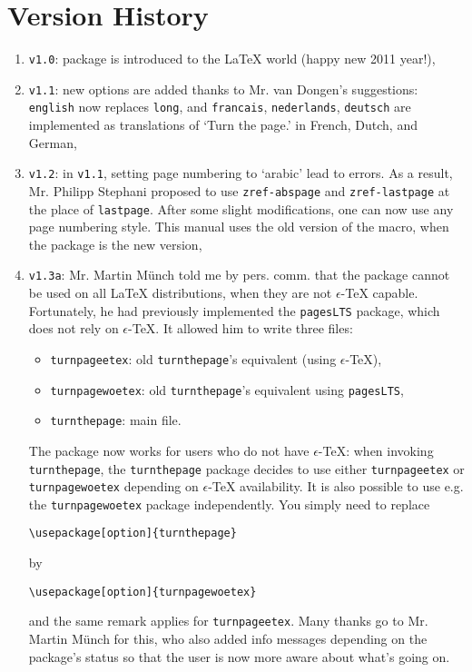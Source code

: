 \documentclass[10pt,a4paper,final,makeidx,twosides]{article}
\newcommand{\etex}{$\epsilon$-\TeX}
\begin{document}
\section{Version History}
\label{sec:vh}
\begin{enumerate}
\addtocounter{enumi}{-1}
 \item \verb|v1.0|: package is introduced to the \LaTeX{} world (happy new 2011 year!),
 \item \verb|v1.1|: new options are added thanks to Mr. van Dongen's suggestions: \verb|english| now replaces \verb|long|, and \verb|francais|, \verb|nederlands|, \verb|deutsch| are implemented as translations of `Turn the page.' in French, Dutch, and German,
 \item \verb|v1.2|: in \verb|v1.1|, setting page numbering to `arabic' lead to errors. As a result, Mr. Philipp Stephani proposed to use \verb|zref-abspage| and \verb|zref-lastpage| at the place of \verb|lastpage|. After some slight modifications, one can now use any page numbering style. This manual uses the old version of the macro, when the package is the new version,
 \item \verb|v1.3a|: Mr. Martin M\"unch told me by pers. comm. that the package cannot be used on all \LaTeX{} distributions, when they are not \etex{} capable. Fortunately, he had previously implemented the \verb|pagesLTS| package, which does not rely on \etex. It allowed him to write three files:
\begin{itemize}
 \item \verb|turnpageetex|: old \verb|turnthepage|'s equivalent (using \etex),
 \item \verb|turnpagewoetex|: old \verb|turnthepage|'s equivalent using \verb|pagesLTS|,
 \item \verb|turnthepage|: main file.
\end{itemize}
The package now works for users who do not have \etex: when invoking \verb|turnthepage|, the \verb|turnthepage| package decides to use either \verb|turnpageetex| or  \verb|turnpagewoetex| depending on \etex{} availability. It is also possible to use e.g. the \verb|turnpagewoetex| package independently. You simply need to replace
\begin{verbatim}
\usepackage[option]{turnthepage}
\end{verbatim}
by
\begin{verbatim}
\usepackage[option]{turnpagewoetex}
\end{verbatim}
and the same remark applies for \verb|turnpageetex|. Many thanks go to Mr. Martin M\"unch for this, who also added info messages depending on the package's status so that the user is now more aware about what's going on.
\end{enumerate}
\end{document}
